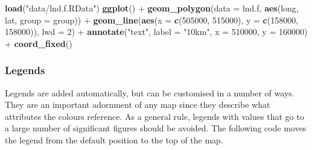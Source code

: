 \documentclass[]{article}
\newenvironment{Shaded}{}{}
\newcommand{\KeywordTok}[1]{\textcolor[rgb]{0.00,0.44,0.13}{\textbf{{#1}}}}
\newcommand{\DataTypeTok}[1]{\textcolor[rgb]{0.56,0.13,0.00}{{#1}}}
\newcommand{\DecValTok}[1]{\textcolor[rgb]{0.25,0.63,0.44}{{#1}}}
\newcommand{\StringTok}[1]{\textcolor[rgb]{0.25,0.44,0.63}{{#1}}}
\newcommand{\NormalTok}[1]{{#1}}
\begin{document}
\begin{Shaded}
\begin{Highlighting}[]
\KeywordTok{load}\NormalTok{(}\StringTok{"data/lnd.f.RData"}\NormalTok{)}
\KeywordTok{ggplot}\NormalTok{() + }\KeywordTok{geom_polygon}\NormalTok{(}\DataTypeTok{data =} \NormalTok{lnd.f, }\KeywordTok{aes}\NormalTok{(long, lat, }\DataTypeTok{group =} \NormalTok{group)) + }\KeywordTok{geom_line}\NormalTok{(}\KeywordTok{aes}\NormalTok{(}\DataTypeTok{x =} \KeywordTok{c}\NormalTok{(}\DecValTok{505000}\NormalTok{, }
    \DecValTok{515000}\NormalTok{), }\DataTypeTok{y =} \KeywordTok{c}\NormalTok{(}\DecValTok{158000}\NormalTok{, }\DecValTok{158000}\NormalTok{)), }\DataTypeTok{lwd =} \DecValTok{2}\NormalTok{) + }\KeywordTok{annotate}\NormalTok{(}\StringTok{"text"}\NormalTok{, }\DataTypeTok{label =} \StringTok{"10km"}\NormalTok{, }
    \DataTypeTok{x =} \DecValTok{510000}\NormalTok{, }\DataTypeTok{y =} \DecValTok{160000}\NormalTok{) + }\KeywordTok{coord_fixed}\NormalTok{()}
\end{Highlighting}
\end{Shaded}

\subsubsection{Legends}

Legends are added automatically, but can be customised in a number of
ways. They are an important adornment of any map since they describe
what attributes the colours reference. As a general rule, legends with values that go to a large number of significant figures should be avoided. The following code moves the legend from the default position to the top of the map.
\end{document}
